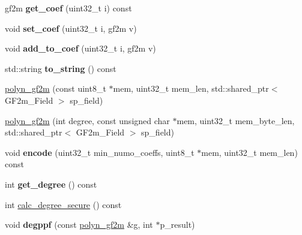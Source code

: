 \begin{DoxyCompactItemize}
gf2m {\bfseries get\+\_\+coef} (uint32\+\_\+t i) const
\item 
\mbox{\label{class_botan_1_1polyn__gf2m_a9541e97454aa675cfe368428f037e050}} 
void {\bfseries set\+\_\+coef} (uint32\+\_\+t i, gf2m v)
\item 
\mbox{\label{class_botan_1_1polyn__gf2m_ac5bcf753353aeff6aafc2b6605fd875d}} 
void {\bfseries add\+\_\+to\+\_\+coef} (uint32\+\_\+t i, gf2m v)
\item 
\mbox{\label{class_botan_1_1polyn__gf2m_a580ea1b2c259a3476170c0f3de6dcaec}} 
std\+::string {\bfseries to\+\_\+string} () const
\item 
\hyperlink{class_botan_1_1polyn__gf2m_af9619fa1c8180c0e729d883a89ea3ffc}{polyn\+\_\+gf2m} (const uint8\+\_\+t $\ast$mem, uint32\+\_\+t mem\+\_\+len, std\+::shared\+\_\+ptr$<$ G\+F2m\+\_\+\+Field $>$ sp\+\_\+field)
\item 
\hyperlink{class_botan_1_1polyn__gf2m_a87baa4743b62dc4cbb4c1d73e4578d8c}{polyn\+\_\+gf2m} (int degree, const unsigned char $\ast$mem, uint32\+\_\+t mem\+\_\+byte\+\_\+len, std\+::shared\+\_\+ptr$<$ G\+F2m\+\_\+\+Field $>$ sp\+\_\+field)
\item 
\mbox{\label{class_botan_1_1polyn__gf2m_a9f9180a4cb3e0f415ec635141b40e554}} 
void {\bfseries encode} (uint32\+\_\+t min\+\_\+numo\+\_\+coeffs, uint8\+\_\+t $\ast$mem, uint32\+\_\+t mem\+\_\+len) const
\item 
\mbox{\label{class_botan_1_1polyn__gf2m_a1a45deb68c9d4235f9493ce62c018486}} 
int {\bfseries get\+\_\+degree} () const
\item 
int \hyperlink{class_botan_1_1polyn__gf2m_ac2b94d1eddf27838f4fcf03db4f8ac08}{calc\+\_\+degree\+\_\+secure} () const
\item 
\mbox{\label{class_botan_1_1polyn__gf2m_a533dee793e004bc1560bcb4d1bd9bb53}} 
void {\bfseries degppf} (const \hyperlink{class_botan_1_1polyn__gf2m}{polyn\+\_\+gf2m} \&g, int $\ast$p\+\_\+result)
\item 
\mbox{\label{class_botan_1_1polyn__gf2m_ae1b6070fc4853e44bcf74a99a686c472}} 

\end{DoxyCompactItemize}
